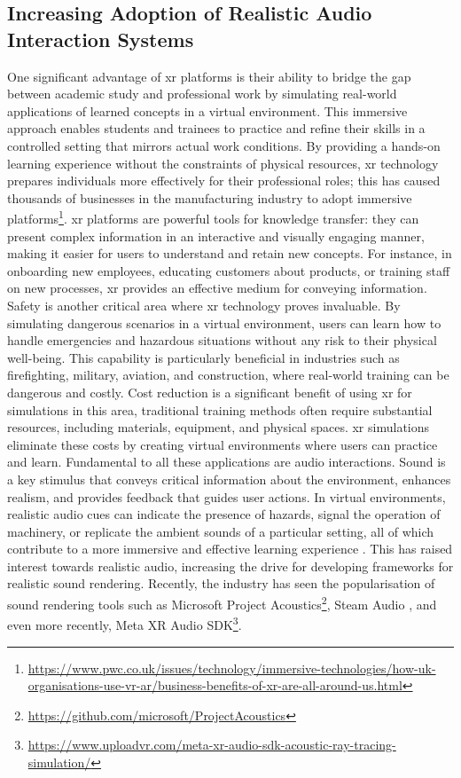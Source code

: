 \subsection{Increasing Adoption of Realistic Audio Interaction Systems}
One significant advantage of \acrshort{xr} platforms is their ability to bridge the gap between academic study and professional work by simulating real-world applications of learned concepts in a virtual environment. This immersive approach enables students and trainees to practice and refine their skills in a controlled setting that mirrors actual work conditions. By providing a hands-on learning experience without the constraints of physical resources, \acrshort{xr} technology prepares individuals more effectively for their professional roles; this has caused thousands of businesses in the manufacturing industry to adopt immersive platforms\footnote{\url{https://www.pwc.co.uk/issues/technology/immersive-technologies/how-uk-organisations-use-vr-ar/business-benefits-of-xr-are-all-around-us.html}}.
\acrshort{xr} platforms are powerful tools for knowledge transfer: they can present complex information in an interactive and visually engaging manner, making it easier for users to understand and retain new concepts. For instance, in onboarding new employees, educating customers about products, or training staff on new processes, \acrshort{xr} provides an effective medium for conveying information.
Safety is another critical area where \acrshort{xr} technology proves invaluable. By simulating dangerous scenarios in a virtual environment, users can learn how to handle emergencies and hazardous situations without any risk to their physical well-being. This capability is particularly beneficial in industries such as firefighting, military, aviation, and construction, where real-world training can be dangerous and costly. Cost reduction is a significant benefit of using \acrshort{xr} for simulations in this area, traditional training methods often require substantial resources, including materials, equipment, and physical spaces. \acrshort{xr} simulations eliminate these costs by creating virtual environments where users can practice and learn.
Fundamental to all these applications are audio interactions. Sound is a key stimulus that conveys critical information about the environment, enhances realism, and provides feedback that guides user actions. In virtual environments, realistic audio cues can indicate the presence of hazards, signal the operation of machinery, or replicate the ambient sounds of a particular setting, all of which contribute to a more immersive and effective learning experience \citep{DEGIORGIO2023645, jot2021rendering}.
This has raised interest towards realistic audio, increasing the drive for developing frameworks for realistic sound rendering. Recently, the industry has seen the popularisation of sound rendering tools such as Microsoft Project Acoustics\footnote{\url{https://github.com/microsoft/ProjectAcoustics}}, Steam Audio \citep{audio2020git}, and even more recently, Meta XR Audio SDK\footnote{\url{https://www.uploadvr.com/meta-xr-audio-sdk-acoustic-ray-tracing-simulation/}}.

